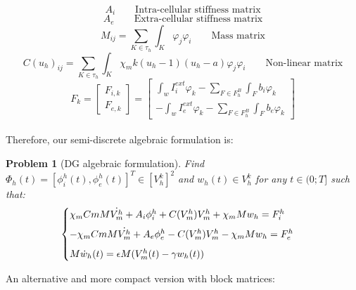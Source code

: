 \documentclass[a4paper,11pt]{article}
\newtheorem{problem}{Problem}
\begin{document}
\begin{equation}
A_i \qquad{\text{Intra-cellular stiffness matrix}}
\end{equation}
\begin{equation}
A_e \qquad{\text{Extra-cellular stiffness matrix}}
\end{equation}
\begin{equation}
M_{ij} = \sum_{K \in \tau_h}\int_K\varphi_j\varphi_i \qquad{\text{Mass matrix}}
\end{equation}
\begin{equation}
C(u_h)_{ij} =  \sum_{K \in \tau_h} \int_K \chi_m k(u_h-1)(u_h-a)\varphi_j\varphi_i \qquad{\text{Non-linear matrix}}
\end{equation}
\begin{equation}
F_k=\begin{bmatrix} F_{i,k} \\ F_{e,k} \end{bmatrix}=\begin{bmatrix} \int_{w} I_i^{ext}\varphi_k - \sum_{F \in F_h^B} \int_F b_i\varphi_k \\ - \int_{w} I_e^{ext}\varphi_k - \sum_{F \in F_h^B} \int_F b_e\varphi_k \end{bmatrix}
\end{equation}
\vspace{3mm} \\
Therefore, our semi-discrete algebraic formulation is: \vspace{3mm}
\begin{problem}[DG algebraic formulation]\label{algebraic}
Find $\Phi_h(t)=[\phi_i^h(t),\phi_e^h(t)]^T \in [V_h^k]^2$ and $w_h(t) \in V_h^k$ for any $t \in (0;T]$ such that:
\begin{equation*}
\begin{cases}
\chi_m Cm M \dot{V_m^h}+A_i \phi_i^h+C(V_m^h) V_m^h+\chi_m M w_h=F_i^h \vspace{2mm} \\ 
-\chi_m Cm M \dot{V_m^h}+A_e \phi_e^h-C(V_m^h) V_m^h-\chi_m M w_h=F_e^h \vspace{2mm} \\ 
M \dot{w}_h(t)=\epsilon M (V_m^h(t)-\gamma w_h(t))
\end{cases}
\end{equation*}
\end{problem}
 \vspace{5mm}
 \noindent An alternative and more compact version with block matrices: \vspace{3mm}
\end{document}
